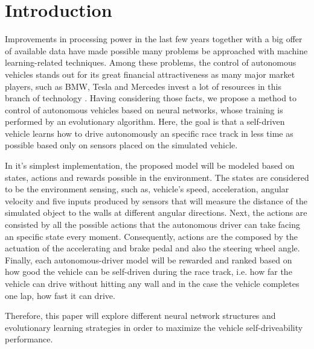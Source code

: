 \section{Introduction}

Improvements in processing power in the last few years together with a big offer of available data have made possible many problems be approached with machine learning-related techniques. Among these problems, the control of autonomous vehicles stands out for its great financial attractiveness as many major market players, such as BMW, Tesla and Mercedes invest a lot of resources in this branch of technology \cite{News}. Having considering those facts, we propose a method to control of autonomous vehicles based on neural networks, whose training is performed by an evolutionary algorithm. Here, the goal is that a self-driven vehicle learns how to drive autonomously an specific race track in less time as possible based only on sensors placed on the simulated vehicle. 

In it's simplest implementation, the proposed model will be modeled based on states, actions and rewards possible in the environment. The states are considered to be the environment sensing, such as, vehicle's speed, acceleration, angular velocity and five inputs produced by sensors that will measure the distance of the simulated object to the walls at different angular directions. Next, the actions are consisted by all the possible actions that the autonomous driver can take facing an specific state every moment. Consequently, actions are the composed by the actuation of the accelerating and brake pedal and also the steering wheel angle. Finally, each autonomous-driver model will be rewarded and ranked based on how good the vehicle can be self-driven during the race track, i.e. how far the vehicle can drive without hitting any wall and in the case the vehicle completes one lap, how fast it can drive.

Therefore, this paper will explore different neural network structures and evolutionary learning strategies in order to maximize the vehicle self-driveability performance.



